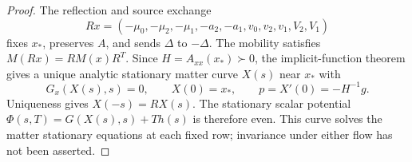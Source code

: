 \begin{proof}
The reflection and source exchange
\begin{equation}
 R x=(-\mu_0,-\mu_2,-\mu_1,-a_2,-a_1,v_0,v_2,v_1,V_2,V_1)
 \label{it2:critical-reflection}
\end{equation}
fixes $x_*$, preserves $A$, and sends $\Delta$ to $-\Delta$. The mobility satisfies $M(Rx)=RM(x)R^T$. Since $H=A_{xx}(x_*)\succ0$, the implicit-function theorem gives a unique analytic stationary matter curve $X(s)$ near $x_*$ with
\begin{equation}
 G_x(X(s),s)=0,\qquad X(0)=x_*,\qquad p=X'(0)=-H^{-1}g.
 \label{it2:critical-stationary-curve}
\end{equation}
Uniqueness gives $X(-s)=RX(s)$. The stationary scalar potential $\Phi(s,T)=G(X(s),s)+Th(s)$ is therefore even. This curve solves the matter stationary equations at each fixed row; invariance under either flow has not been asserted.


\end{proof}
